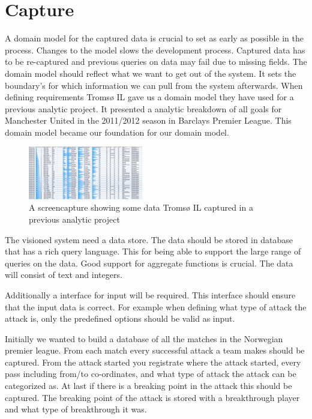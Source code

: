 \section{Capture}

A domain model for the captured data is crucial to set as early as possible in the process.  Changes to the model slows the development process. Captured data has to be re-captured and previous queries on data may fail due to missing fields. The domain model should reflect what we want to get out of the system. It sets the boundary's for which information we can pull from the system afterwards. When defining requirements Tromsø IL gave us a domain model they have used for a previous analytic project. It presented a analytic breakdown of all goals for Manchester United in the 2011/2012 season in Barclays Premier League. This domain model became our foundation for our domain model.

\begin{figure}[ht!]
\centering
\includegraphics[width=50mm]{images/general/prev_domain_model.png}
\caption{A screencapture showing some data Tromsø IL captured in a previous analytic project}
\end{figure}

The visioned system need a data store. The data should be stored in database that has a rich query language. This for being able to support the large range of queries on the data. Good support for aggregate functions is crucial.  The data will consist of text and integers.

Additionally a interface for input will be required. This interface should ensure that the input data is correct. For example when defining what type of attack the attack is, only the predefined options should be valid as input. 

Initially we wanted to build a database of all the matches in the Norwegian premier league. From each match every successful attack a team makes should be captured. From the attack started you registrate where the attack started, every pass including from/to co-ordinates, and what type of attack the attack can be categorized as. At last if there is a breaking point in the attack this should be captured. The breaking point of the attack is stored with a breakthrough player and what type of breakthrough it was.


